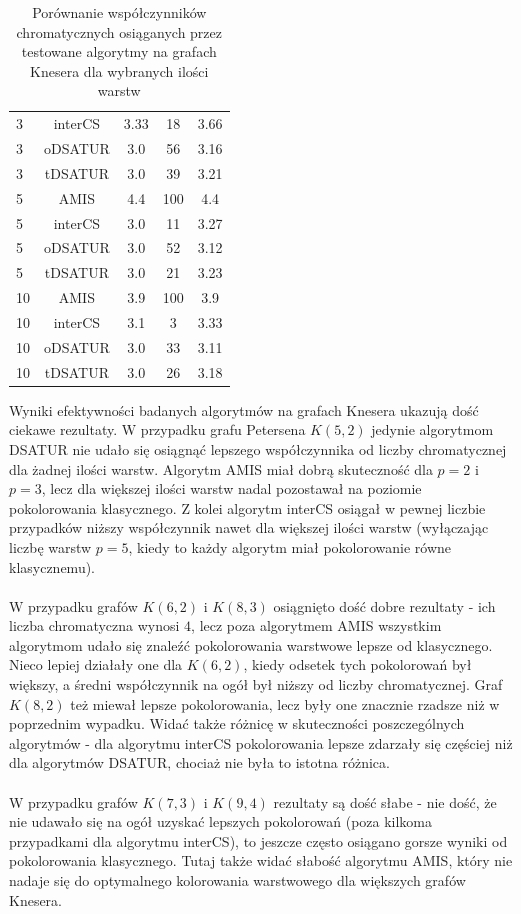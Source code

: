 \documentclass[10pt,a4paper]{article}
\begin{document}
\begin{table}[H]
\begin{minipage}{\linewidth}
\begin{tabular}{|l|c|c|c|c|}
				3 & interCS & 3.33 & 18 & 3.66 \\
				3 & oDSATUR & 3.0 & 56 & 3.16 \\
				3 & tDSATUR & 3.0 & 39 & 3.21 \\
				\hline
				5 & AMIS & 4.4 & 100 & 4.4 \\
				5 & interCS & 3.0 & 11 & 3.27 \\
				5 & oDSATUR & 3.0 & 52 & 3.12 \\
				5 & tDSATUR & 3.0 & 21 & 3.23 \\
				\hline
				10 & AMIS & 3.9 & 100 & 3.9 \\
				10 & interCS & 3.1 & 3 & 3.33 \\
				10 & oDSATUR & 3.0 & 33 & 3.11 \\
				10 & tDSATUR & 3.0 & 26 & 3.18 \\
				\hline
			\end{tabular}
			\caption{$K(9,4)$}
		\end{minipage}
		\caption{Porównanie współczynników chromatycznych osiąganych przez testowane algorytmy na grafach Knesera dla wybranych ilości warstw }
	\end{table}

	Wyniki efektywności badanych algorytmów na grafach Knesera ukazują dość ciekawe rezultaty. W przypadku grafu Petersena $K(5,2)$ jedynie algorytmom DSATUR nie udało się osiągnąć lepszego współczynnika od liczby chromatycznej dla żadnej ilości warstw. Algorytm AMIS miał dobrą skuteczność dla $p = 2$ i $p = 3$, lecz dla większej ilości warstw nadal pozostawał na poziomie pokolorowania klasycznego. Z kolei algorytm interCS osiągał w pewnej liczbie przypadków niższy współczynnik nawet dla większej ilości warstw (wyłączając liczbę warstw $p = 5$, kiedy to każdy algorytm miał pokolorowanie równe klasycznemu). 
	\\~\\
	W przypadku grafów $K(6,2)$ i $K(8,3)$ osiągnięto dość dobre rezultaty - ich liczba chromatyczna wynosi $4$, lecz poza algorytmem AMIS wszystkim algorytmom udało się znaleźć pokolorowania warstwowe lepsze od klasycznego. Nieco lepiej działały one dla $K(6, 2)$, kiedy odsetek tych pokolorowań był większy, a średni współczynnik na ogół był niższy od liczby chromatycznej. Graf $K(8, 2)$ też miewał lepsze pokolorowania, lecz były one znacznie rzadsze niż w poprzednim wypadku. Widać także różnicę w skuteczności poszczególnych algorytmów - dla algorytmu interCS pokolorowania lepsze zdarzały się częściej niż dla algorytmów DSATUR, chociaż nie była to istotna różnica. 
	\\~\\
	W przypadku grafów $K(7,3)$ i $K(9,4)$ rezultaty są dość słabe - nie dość, że nie udawało się na ogół uzyskać lepszych pokolorowań (poza kilkoma przypadkami dla algorytmu interCS), to jeszcze często osiągano gorsze wyniki od pokolorowania klasycznego. Tutaj także widać słabość algorytmu AMIS, który nie nadaje się do optymalnego kolorowania warstwowego dla większych grafów Knesera.
	
\end{document}
